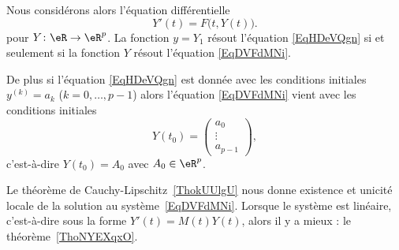 Nous considérons alors l'équation différentielle
\begin{equation}    \label{EqDVFdMNi}
	Y'(t)=F\big( t,Y(t) \big).
\end{equation}
pour \( Y\colon \eR\to  \eR^p\). La fonction \( y=Y_1\) résout l'équation \eqref{EqHDeVQgn} si et seulement si la fonction \( Y\) résout l'équation \eqref{EqDVFdMNi}.

De plus si l'équation \eqref{EqHDeVQgn} est donnée avec les conditions initiales \( y^{(k)}=a_k\) (\( k=0,\ldots, p-1\)) alors l'équation \eqref{EqDVFdMNi} vient avec les conditions initiales
\begin{equation}
	Y(t_0)=\begin{pmatrix}
		a_0    \\
		\vdots \\
		a_{p-1}
	\end{pmatrix},
\end{equation}
c'est-à-dire \( Y(t_0)=A_0\) avec \( A_0\in \eR^p\).

Le théorème de Cauchy-Lipschitz~\ref{ThokUUlgU} nous donne existence et unicité locale de la solution au système~\ref{EqDVFdMNi}. Lorsque le système est linéaire, c'est-à-dire sous la forme \( Y'(t)=M(t)Y(t)\), alors il y a mieux : le théorème~\ref{ThoNYEXqxO}.

